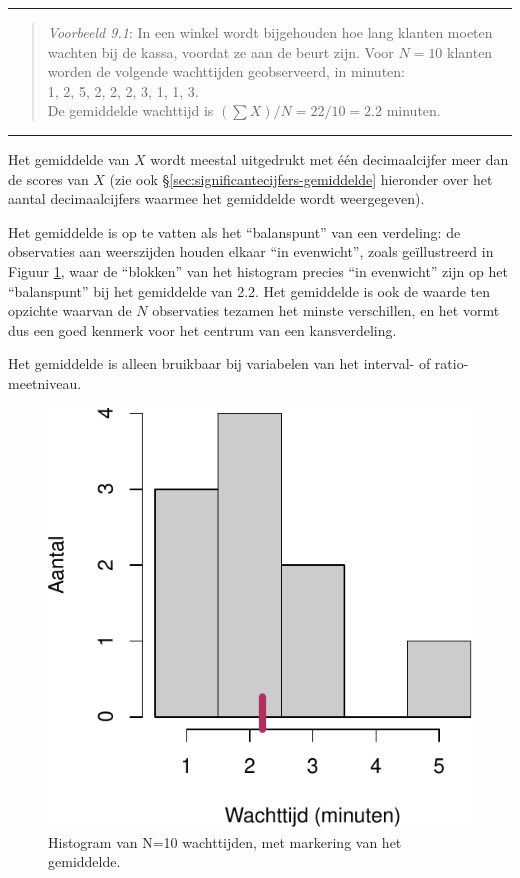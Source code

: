 \documentclass[
]{book}
\begin{document}
\begin{center}\rule{0.5\linewidth}{0.5pt}\end{center}

\begin{quote}
\emph{Voorbeeld 9.1}: In
een winkel wordt bijgehouden hoe lang klanten moeten wachten bij de
kassa, voordat ze aan de beurt zijn. Voor \(N=10\) klanten worden de
volgende wachttijden geobserveerd, in minuten:\\
1, 2, 5, 2, 2, 2, 3, 1, 1, 3.\\
De gemiddelde wachttijd is \((\sum X)/N = 22/10 = 2.2\) minuten.
\end{quote}

\begin{center}\rule{0.5\linewidth}{0.5pt}\end{center}

Het gemiddelde van \(X\) wordt meestal uitgedrukt met één decimaalcijfer meer dan
de scores van \(X\) (zie ook §\ref{sec:significantecijfers-gemiddelde} hieronder over het aantal decimaalcijfers waarmee het gemiddelde wordt weergegeven).

Het gemiddelde is op te vatten als het ``balanspunt'' van een verdeling:
de observaties aan weerszijden houden elkaar ``in evenwicht'', zoals
geïllustreerd in Figuur \ref{fig:wachttijden-hist}, waar de ``blokken'' van het histogram
precies ``in evenwicht'' zijn op het ``balanspunt'' bij het gemiddelde van
2.2. Het gemiddelde is ook de waarde ten opzichte waarvan de \(N\)
observaties tezamen het minste verschillen, en het vormt dus een goed
kenmerk voor het centrum van een kansverdeling.

Het gemiddelde is alleen bruikbaar bij variabelen van het interval- of
ratio-meetniveau.

\begin{figure}
\centering
\includegraphics{KMS-NL_files/figure-latex/wachttijden-hist-1.pdf}
\caption{\label{fig:wachttijden-hist}Histogram van N=10 wachttijden, met markering van het gemiddelde.}
\end{figure}
\end{document}
